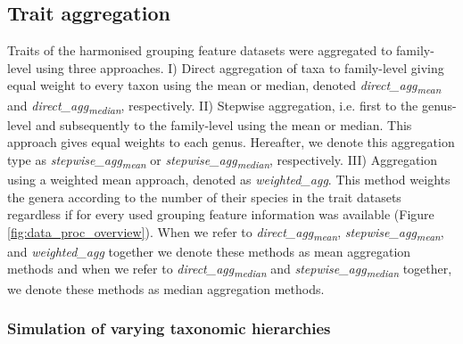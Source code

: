 \documentclass{article}
\begin{document}

\subsection*{Trait aggregation}

Traits of the harmonised grouping feature datasets were aggregated to family-level using three approaches. I) Direct aggregation of taxa to family-level giving equal weight to every taxon using the mean or median, denoted \textit{direct\_agg\textsubscript{mean}} and \textit{direct\_agg\textsubscript{median}}, respectively. II) Stepwise aggregation, i.e. first to the genus-level and subsequently to the family-level using the mean or median. This approach gives equal weights to each genus. Hereafter, we denote this aggregation type as \textit{stepwise\_agg\textsubscript{mean}} or \textit{stepwise\_agg\textsubscript{median}}, respectively. III) Aggregation using a weighted mean approach, denoted as \textit{weighted\_agg}. This method weights the genera according to the number of their species in the trait datasets regardless if for every used grouping feature information was available (Figure \ref{fig:data_proc_overview}). When we refer to \textit{direct\_agg\textsubscript{mean}}, \textit{stepwise\_agg\textsubscript{mean}}, and \textit{weighted\_agg} together we denote these methods as mean aggregation methods and when we refer to \textit{direct\_agg\textsubscript{median}} and \textit{stepwise\_agg\textsubscript{median}} together, we denote these methods as median aggregation methods.

\subsubsection*{Simulation of varying taxonomic hierarchies}
\end{document}

